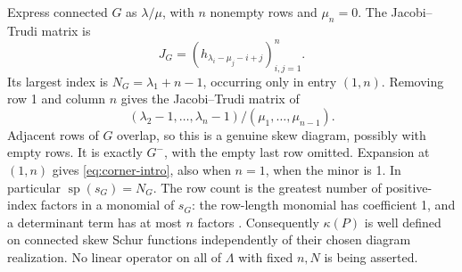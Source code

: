 \documentclass[11pt,a4paper]{amsart}
\numberwithin{equation}{section}
\theoremstyle{plain}
\theoremstyle{definition}
\begin{document}
Express connected \(G\) as \(\lambda/\mu\), with \(n\) nonempty rows and \(\mu_n=0\).  The Jacobi--Trudi matrix is
\begin{equation}\label{eq:jt}
 J_G=(h_{\lambda_i-\mu_j-i+j})_{i,j=1}^n.
\end{equation}
Its largest index is \(N_G=\lambda_1+n-1\), occurring only in entry \((1,n)\).  Removing row 1 and column \(n\) gives the Jacobi--Trudi matrix of
\begin{equation}\label{eq:minor-shape}
 (\lambda_2-1,\ldots,\lambda_n-1)/(\mu_1,\ldots,\mu_{n-1}).
\end{equation}
Adjacent rows of \(G\) overlap, so this is a genuine skew diagram, possibly with empty rows.  It is exactly \(G^-\), with the empty last row omitted.  Expansion at \((1,n)\) gives \eqref{eq:corner-intro}, also when \(n=1\), when the minor is 1.  In particular \(\operatorname{sp}(s_G)=N_G\).  The row count is the greatest number of positive-index factors in a monomial of \(s_G\): the row-length monomial has coefficient 1, and a determinant term has at most \(n\) factors \cite[Prop.~6.2]{Reiner2007Coincidences}.  Consequently \(\kappa(P)\) is well defined on connected skew Schur functions independently of their chosen diagram realization.  No linear operator on all of \(\Lambda\) with fixed \(n,N\) is being asserted.
\end{document}
